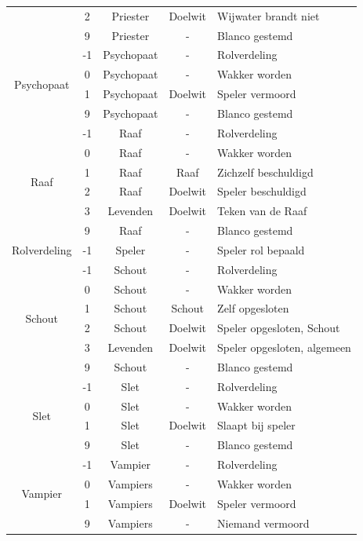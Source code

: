 \documentclass[12pt]{article}
\begin{document}
\begin{center}
\begin{longtable}{c|c|c|c|l}
       & 2 & Priester & Doelwit & Wijwater brandt niet \\
       & 9 & Priester & - & Blanco gestemd \\
      \hline
      \multirow{4}{*}{Psychopaat} & -1 & Psychopaat & - & Rolverdeling \\
       & 0 & Psychopaat & - & Wakker worden \\
       & 1 & Psychopaat & Doelwit & Speler vermoord \\
       & 9 & Psychopaat & - & Blanco gestemd \\
      \hline
      \multirow{6}{*}{Raaf} & -1 & Raaf & - & Rolverdeling \\
       & 0 & Raaf & - & Wakker worden \\
       & 1 & Raaf & Raaf & Zichzelf beschuldigd \\
       & 2 & Raaf & Doelwit & Speler beschuldigd \\
       & 3 & Levenden & Doelwit & Teken van de Raaf \\
       & 9 & Raaf & - & Blanco gestemd \\
      \hline
      \multirow{1}{*}{Rolverdeling} & -1 & Speler & - & Speler rol bepaald \\
      \hline
      \multirow{6}{*}{Schout} & -1 & Schout & - & Rolverdeling \\
       & 0 & Schout & - & Wakker worden \\
       & 1 & Schout & Schout & Zelf opgesloten \\
       & 2 & Schout & Doelwit & Speler opgesloten, Schout \\
       & 3 & Levenden & Doelwit & Speler opgesloten, algemeen \\
       & 9 & Schout & - & Blanco gestemd \\
      \hline
      \multirow{4}{*}{Slet} & -1 & Slet & - & Rolverdeling \\
       & 0 & Slet & - & Wakker worden \\
       & 1 & Slet & Doelwit & Slaapt bij speler \\
       & 9 & Slet & - & Blanco gestemd \\
      \hline
      \multirow{4}{*}{Vampier} & -1 & Vampier & - & Rolverdeling \\
       & 0 & Vampiers & - & Wakker worden \\
       & 1 & Vampiers & Doelwit & Speler vermoord \\
       & 9 & Vampiers & - & Niemand vermoord \\

\end{longtable}
\end{center}
\end{document}
